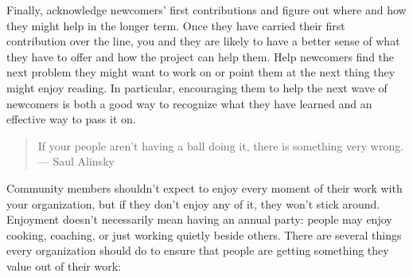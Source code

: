 Finally,
acknowledge newcomers' first contributions
and figure out where and how they might help in the longer term.
Once they have carried their first contribution over the line,
you and they are likely to have a better sense of what they have to offer
and how the project can help them.
Help newcomers find the next problem they might want to work on
or point them at the next thing they might enjoy reading.
In particular,
encouraging them to help the next wave of newcomers
is both a good way to recognize what they have learned
and an effective way to pass it on.


\begin{quote}

  If your people aren't having a ball doing it, there is something very wrong.\\
  --- Saul Alinsky

\end{quote}

Community members shouldn't expect to enjoy every moment of their work with your organization,
but if they don't enjoy any of it,
they won't stick around.
Enjoyment doesn't necessarily mean having an annual party:
people may enjoy cooking,
coaching,
or just working quietly beside others.
There are several things every organization should do to ensure
that people are getting something they value out of their work:

